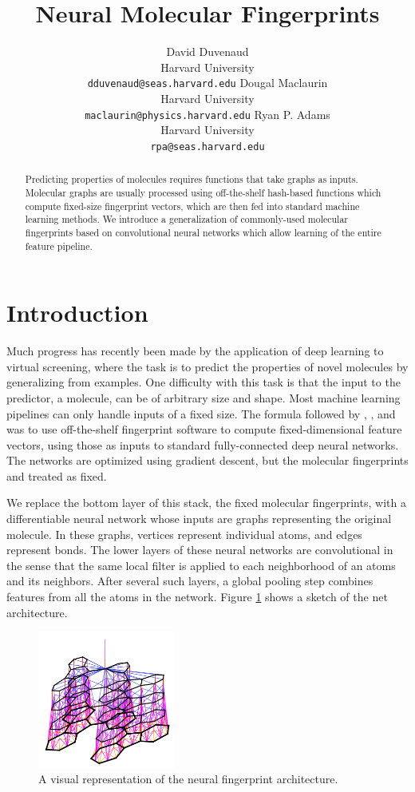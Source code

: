 \documentclass{article}
\title{Neural Molecular Fingerprints}
\author{
David Duvenaud\\
Harvard University\\
\texttt{dduvenaud@seas.harvard.edu}
\And
Dougal Maclaurin\\
Harvard University\\
\texttt{maclaurin@physics.harvard.edu}
\And
Ryan P. Adams\\
Harvard University\\
\texttt{rpa@seas.harvard.edu}
}
\begin{document}
\maketitle

\begin{abstract}
Predicting properties of molecules requires functions that take graphs as inputs.
Molecular graphs are usually processed using off-the-shelf hash-based functions which compute fixed-size fingerprint vectors, which are then fed into standard machine learning methods.
We introduce a generalization of commonly-used molecular fingerprints based on convolutional neural networks which allow learning of the entire feature pipeline.
\end{abstract}

\section{Introduction}

Much progress has recently been made by the application of deep learning to virtual screening, where the task is to predict the properties of novel molecules by generalizing from examples.
One difficulty with this task is that the input to the predictor, a molecule, can be of arbitrary size and shape.
Most machine learning pipelines can only handle inputs of a fixed size.
The formula followed by \cite{unterthinerdeep}, \cite{unterthiner2015toxicity}, and \cite{ramsundar2015massively} was to use off-the-shelf fingerprint software to compute fixed-dimensional feature vectors, using those as inputs to standard fully-connected deep neural networks.
The networks are optimized using gradient descent, but the molecular fingerprints and treated as fixed.

We replace the bottom layer of this stack, the fixed molecular fingerprints, with a differentiable neural network whose inputs are graphs representing the original molecule.
In these graphs, vertices represent individual atoms, and edges represent bonds.
The lower layers of these neural networks are convolutional in the sense that the same local filter is applied to each neighborhood of an atoms and its neighbors.
After several such layers, a global pooling step combines features from all the atoms in the network.
Figure \ref{fig:architecture sketch} shows a sketch of the net architecture.

\begin{figure}
\centerline{\includegraphics[width=0.4\textwidth]{figures/3d-nets/net1}}
\caption{A visual representation of the neural fingerprint architecture.}
\label{fig:architecture sketch}
\end{figure}
\end{document}
